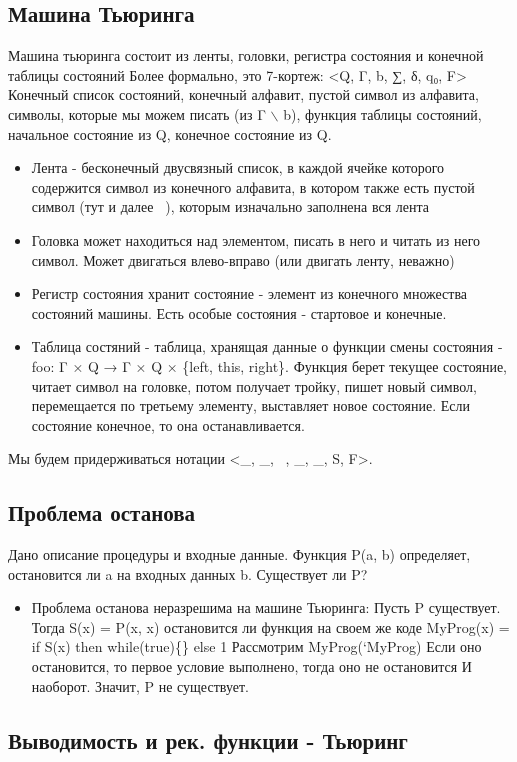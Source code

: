 \documentclass[11pt]{article}
\begin{document}
\subsection{Машина Тьюринга}
\label{sec-12-3}
Машина тьюринга состоит из ленты, головки, регистра состояния и конечной
таблицы состояний
Более формально, это 7-кортеж: <Q, Γ, b, ∑, δ, q₀, F>
Конечный список состояний, конечный алфавит, пустой символ из алфавита,
символы, которые мы можем писать (из Γ $\backslash$ b), функция таблицы состояний,
начальное состояние из Q, конечное состояние из Q.
\begin{itemize}
\item Лента - бесконечный двусвязный список, в каждой ячейке которого
содержится символ из конечного алфавита, в котором также есть
пустой символ (тут и далее  ), которым изначально заполнена вся
лента
\item Головка может находиться над элементом, писать в него и читать из
него символ. Может двигаться влево-вправо (или двигать ленту, неважно)
\item Регистр состояния хранит состояние - элемент из конечного множества
состояний машины. Есть особые состояния - стартовое и конечные.
\item Таблица состяний - таблица, хранящая данные о функции смены
состояния - foo: Γ × Q → Γ × Q × \{left, this, right\}.
Функция берет текущее состояние, читает символ на головке, потом
получает тройку, пишет новый символ, перемещается по третьему
элементу, выставляет новое состояние. Если состояние конечное, то
она останавливается.
\end{itemize}
Мы будем придерживаться нотации <\_, \_,  , \_, \_, S, F>.
\subsection{Проблема останова}
\label{sec-12-4}
Дано описание процедуры и входные данные. Функция P(a, b) определяет,
остановится ли a на входных данных b. Существует ли P?
\begin{itemize}
\item Проблема останова неразрешима на машине Тьюринга:
Пусть P существует.
Тогда S(x) = P(x, x) остановится ли функция на своем же коде
MyProg(x) = if S(x) then while(true)\{\} else 1
Рассмотрим MyProg(`MyProg)
Если оно остановится, то первое условие выполнено, тогда оно не остановится
И наоборот.
Значит, P не существует.
\end{itemize}
\subsection{Выводимость и рек. функции - Тьюринг}
\label{sec-12-5}
\end{document}
